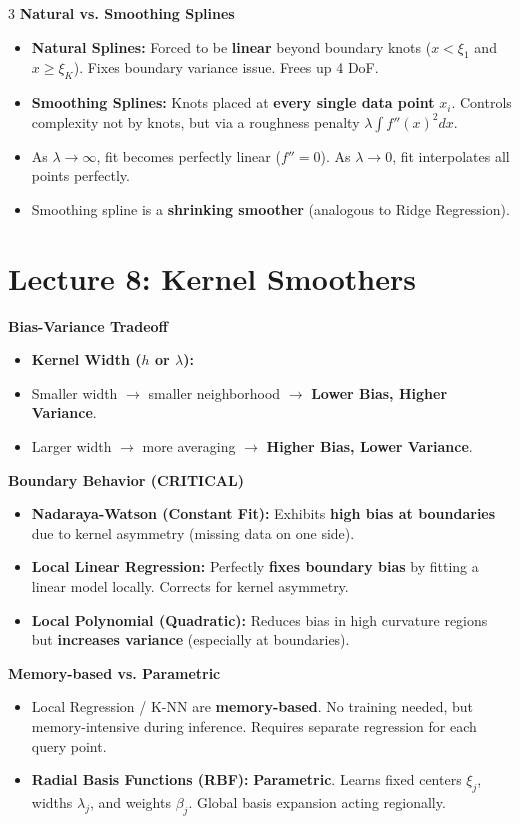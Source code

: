 \documentclass[10pt,landscape]{article}
\begin{document}
\begin{multicols*}{3}
\textbf{Natural vs. Smoothing Splines}
\begin{itemize}
    \item \textbf{Natural Splines:} Forced to be \textbf{linear} beyond boundary knots ($x < \xi_1$ and $x \ge \xi_K$). Fixes boundary variance issue. Frees up 4 DoF.
    \item \textbf{Smoothing Splines:} Knots placed at \textbf{every single data point} $x_i$. Controls complexity not by knots, but via a roughness penalty $\lambda \int f''(x)^2 dx$.
    \item As $\lambda \to \infty$, fit becomes perfectly linear ($f'' = 0$). As $\lambda \to 0$, fit interpolates all points perfectly.
    \item Smoothing spline is a \textbf{shrinking smoother} (analogous to Ridge Regression).
\end{itemize}

\section{Lecture 8: Kernel Smoothers}
\textbf{Bias-Variance Tradeoff}
\begin{itemize}
    \item \textbf{Kernel Width ($h$ or $\lambda$):} 
    \item Smaller width $\to$ smaller neighborhood $\to$ \textbf{Lower Bias, Higher Variance}.
    \item Larger width $\to$ more averaging $\to$ \textbf{Higher Bias, Lower Variance}.
\end{itemize}

\textbf{Boundary Behavior (CRITICAL)}
\begin{itemize}
    \item \textbf{Nadaraya-Watson (Constant Fit):} Exhibits \textbf{high bias at boundaries} due to kernel asymmetry (missing data on one side).
    \item \textbf{Local Linear Regression:} Perfectly \textbf{fixes boundary bias} by fitting a linear model locally. Corrects for kernel asymmetry.
    \item \textbf{Local Polynomial (Quadratic):} Reduces bias in high curvature regions but \textbf{increases variance} (especially at boundaries).
\end{itemize}

\textbf{Memory-based vs. Parametric}
\begin{itemize}
    \item Local Regression / K-NN are \textbf{memory-based}. No training needed, but memory-intensive during inference. Requires separate regression for each query point.
    \item \textbf{Radial Basis Functions (RBF):} \textbf{Parametric}. Learns fixed centers $\xi_j$, widths $\lambda_j$, and weights $\beta_j$. Global basis expansion acting regionally.
\end{itemize}


\end{multicols*}
\end{document}
